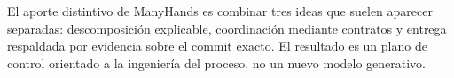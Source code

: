 El aporte distintivo de ManyHands es combinar tres ideas que suelen aparecer
separadas: descomposición explicable, coordinación mediante contratos y entrega
respaldada por evidencia sobre el commit exacto. El resultado es un plano de
control orientado a la ingeniería del proceso, no un nuevo modelo generativo.
